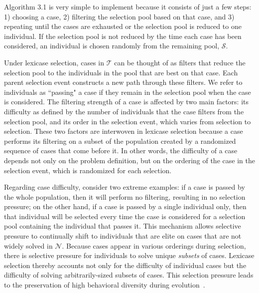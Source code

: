 \documentclass[twoside]{article}
\begin{document}
Algorithm 3.1 is very simple to implement because it consists of just a few steps: 1) choosing a case, 2) filtering the selection pool based on that case, and 3) repeating until the cases are exhausted or the selection pool is reduced to one individual. If the selection pool is not reduced by the time each case has been considered, an individual is chosen randomly from the remaining pool, $\mathcal{S}$. 

Under lexicase selection, cases in $\mathcal{T}$ can be thought of as filters that reduce the selection pool to the individuals in the pool that are best on that case. Each parent selection event constructs a new path through these filters. We refer to individuals as ``passing" a case if they remain in the selection pool when the case is considered. The filtering strength of a case is affected by two main factors: its difficulty as defined by the number of individuals that the case filters from the selection pool, and its order in the selection event, which varies from selection to selection. These two factors are interwoven in lexicase selection because a case performs its filtering on a subset of the population created by a randomized sequence of cases that come before it. In other words, the difficulty of a case depends not only on the problem definition, but on the ordering of the case in the selection event, which is randomized for each selection.

Regarding case difficulty, consider two extreme examples: if a case is passed by the whole population, then it will perform no filtering, resulting in no selection pressure; on the other hand, if a case is passed by a single individual only, then that individual will be selected every time the case is considered for a selection pool containing the individual that passes it. This mechanism allows selective pressure to continually shift to individuals that are elite on cases that are not widely solved in $\mathcal{N}$. Because cases appear in various orderings during selection, there is selective pressure for individuals to solve unique {\it subsets} of cases. Lexicase selection thereby accounts not only for the difficulty of individual cases but the difficulty of solving arbitrarily-sized subsets of cases. This selection pressure leads to the preservation of high behavioral diversity during evolution~\citep{Helmuth:2015:GPTP, la_cava_epsilon-lexicase_2016}. 
\end{document}
